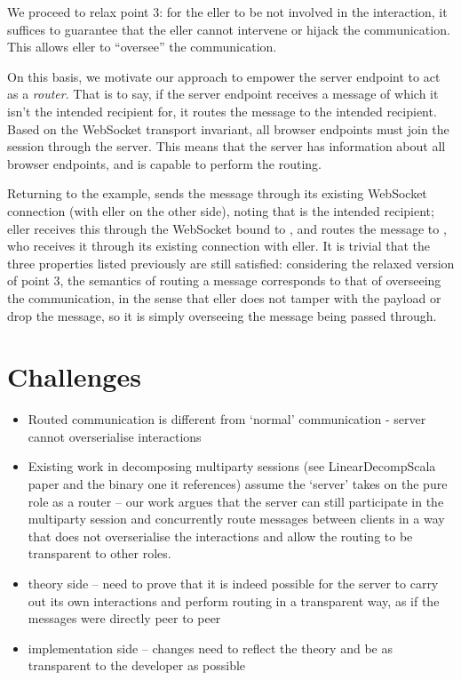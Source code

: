 We proceed to relax point 3: for the eller to be
not involved in the interaction, it suffices to guarantee that
the eller cannot intervene or hijack the communication.
This allows eller to ``oversee'' the communication.

On this basis, we motivate our approach to empower the 
server endpoint to act as a \textit{router}. 
That is to say, if the server endpoint receives a message
of which it isn't the intended recipient for, 
it routes the message to the intended recipient. 
Based on the WebSocket transport invariant,
all browser endpoints must join the session
through the server. This means that the server has information about
all browser endpoints, 
and is capable to perform the routing.

Returning to the  example,
 sends the  message through its existing
WebSocket connection (with eller on the other side),
noting that  is the intended recipient;
eller receives this through the WebSocket bound to
, and routes the message to , who receives it through
its existing connection with eller.
It is trivial that the three properties listed previously are still
satisfied: considering the relaxed version of point 3,
the semantics of routing a message corresponds to that of
overseeing the communication, in the sense that eller 
does not tamper with the payload or drop the message, so it is simply
overseeing the message being passed through.

\section{Challenges}
\label{section:routerchallenges}

% 

\begin{itemize}
\item Routed communication is different from `normal' communication
- server cannot overserialise interactions
\item Existing work in decomposing multiparty sessions (see LinearDecompScala paper and the binary one it references) assume the `server' takes on the pure role as a router -- our work argues that the server can still participate in the multiparty session and concurrently route messages between clients in a way that does not overserialise the interactions and allow the routing to be transparent to other roles.
\item theory side -- need to prove that it is indeed possible for the server to carry out its own interactions and perform routing in a transparent way, as if the messages were directly peer to peer
\item implementation side -- changes need to reflect the theory and be as transparent to the developer as possible
\end{itemize}